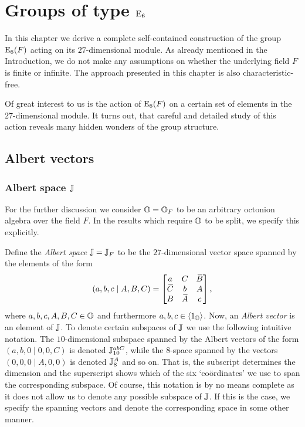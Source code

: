 \chapter{Groups of type $\mathord{\mathrm{E}}_6$}
\ifpdf
    \graphicspath{{Chapter2/Chapter2Figs/PNG/}{Chapter2/Chapter2Figs/PDF/}{Chapter2/Chapter2Figs/}}
\else
    \graphicspath{{Chapter2/Chapter2Figs/EPS/}{Chapter2/Chapter2Figs/}}
\fi

\label{chapter2}

In this chapter we derive a complete self-contained construction
of the group $\mathrm{E}_6(F)$ acting on its $27$-dimensional 
module. As already
mentioned in the Introduction, we do not make any assumptions
on whether the underlying field $F$ is finite or infinite. The 
approach presented in this chapter is also characteristic-free.

Of great interest to us is the action of $\mathrm{E}_6(F)$ on a certain
set of elements in the $27$-dimensional module. It turns out,
that careful and detailed study of this action reveals many
hidden wonders of the group structure.

\section{Albert vectors}

\subsection{Albert space $\mathbb{J}$}

For the further discussion we consider $\mathbb{O} = \mathbb{O}_F$ to be an arbitrary 
octonion algebra over the field $F$. In the results which require $\mathbb{O}$ to be split,
we specify this explicitly. 

Define the \textit{Albert space} $\mathbb{J}=\mathbb{J}_F$ to be 
the $27$-dimensional vector space spanned by the elements of the form
\begin{equation}
	(a,b,c\mid A,B,C) = \begin{bmatrix}
		a & C & \ovB \\
		\ovC & b & A \\
		B & \ovA & c
	\end{bmatrix},
\end{equation}
where $a,b,c,A,B,C \in \mathbb{O}$ and furthermore $a,b,c \in \langle 1_{\mathbb{O}} \rangle$. 
Now, an \textit{Albert vector} is an element of $\mathbb{J}$. To denote
certain subspaces of $\mathbb{J}$ we use the following intuitive notation. The $10$-dimensional
subspace spanned by the Albert vectors of the form \mbox{$(a,b,0\mid 0,0,C)$} is denoted
$\mathbb{J}_{10}^{abC}$, while the $8$-space spanned by the vectors \mbox{$(0,0,0\mid A,0,0)$} 
is denoted $\mathbb{J}_{8}^{A}$ and so on. That is, the subscript determines the dimension
and the superscript shows which of the six `co{\"o}rdinates' we use to span the
corresponding subspace. Of course, this notation is by no means complete as it does not
allow us to denote any possible subspace of $\mathbb{J}$. If this is the case, we specify 
the spanning vectors and denote the corresponding space in some other manner.


